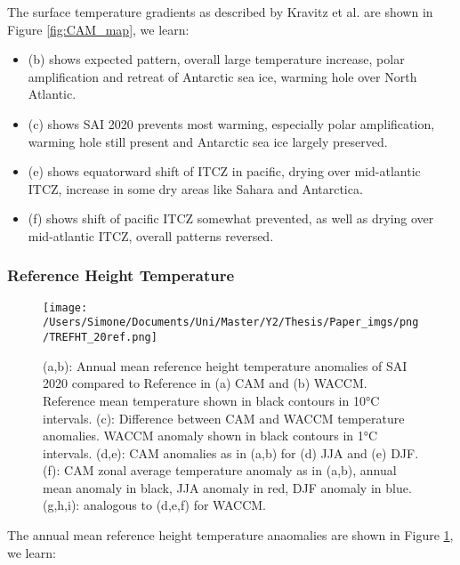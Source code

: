 The surface temperature gradients as described by Kravitz et al. are shown in Figure \ref{fig:CAM_map}, we learn:
\begin{itemize}
	\item (b) shows expected pattern, overall large temperature increase, polar amplification and retreat of Antarctic sea ice, warming hole over North Atlantic. 
	\item (c) shows SAI 2020 prevents most warming, especially polar amplification, warming hole still present and Antarctic sea ice largely preserved. 
	\item (e) shows equatorward shift of ITCZ in pacific, drying over mid-atlantic ITCZ, increase in some dry areas like Sahara and Antarctica.
	\item (f) shows shift of pacific ITCZ somewhat prevented, as well as drying over mid-atlantic ITCZ, overall patterns reversed. 
\end{itemize}

\subsubsection{Reference Height Temperature}

\begin{figure}[H]
	\centering
	\texttt{[image: /Users/Simone/Documents/Uni/Master/Y2/Thesis/Paper\_imgs/png/TREFHT\_20ref.png]}
	\caption{(a,b): Annual mean reference height temperature anomalies of SAI 2020 compared to Reference in (a) CAM and (b) WACCM. Reference mean temperature shown in black contours in 10°C intervals. (c): Difference between CAM and WACCM temperature anomalies. WACCM anomaly shown in black contours in 1°C intervals. (d,e): CAM anomalies as in (a,b) for (d) JJA and (e) DJF. (f): CAM zonal average temperature anomaly as in (a,b), annual mean anomaly in black, JJA anomaly in red, DJF anomaly in blue. (g,h,i): analogous to (d,e,f) for WACCM.}
	\label{fig:TREFHT}
\end{figure} 

The annual mean reference height temperature anaomalies are shown in Figure \ref{fig:TREFHT}, we learn:

